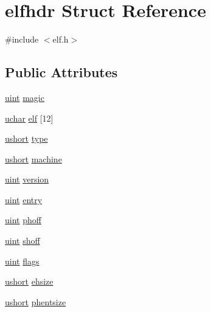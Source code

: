 \hypertarget{structelfhdr}{}\section{elfhdr Struct Reference}
\label{structelfhdr}


{\ttfamily \#include $<$elf.\+h$>$}

\subsection*{Public Attributes}
\begin{DoxyCompactItemize}
\item 
\hyperlink{types_8h_a91ad9478d81a7aaf2593e8d9c3d06a14}{uint} \hyperlink{structelfhdr_a28ee8116d69b533277311c5f3773b6b2}{magic}
\item 
\hyperlink{types_8h_a65f85814a8290f9797005d3b28e7e5fc}{uchar} \hyperlink{structelfhdr_a22ec6f2383f0488ee18a18673398f201}{elf} \mbox{[}12\mbox{]}
\item 
\hyperlink{types_8h_ab95f123a6c9bcfee6a343170ef8c5f69}{ushort} \hyperlink{structelfhdr_a2cd2eaf0c952e30f8196890787ef68fe}{type}
\item 
\hyperlink{types_8h_ab95f123a6c9bcfee6a343170ef8c5f69}{ushort} \hyperlink{structelfhdr_a17113c58d39b044bb1ae78733a8c68fc}{machine}
\item 
\hyperlink{types_8h_a91ad9478d81a7aaf2593e8d9c3d06a14}{uint} \hyperlink{structelfhdr_abb1c8274f47cfdbbcefe44af2d5c723d}{version}
\item 
\hyperlink{types_8h_a91ad9478d81a7aaf2593e8d9c3d06a14}{uint} \hyperlink{structelfhdr_ad40755e1b2c6efc3ec0ad95889f743a5}{entry}
\item 
\hyperlink{types_8h_a91ad9478d81a7aaf2593e8d9c3d06a14}{uint} \hyperlink{structelfhdr_a1d463f67fcf951c06cfaa37850004c51}{phoff}
\item 
\hyperlink{types_8h_a91ad9478d81a7aaf2593e8d9c3d06a14}{uint} \hyperlink{structelfhdr_a465ccdf83d0e26d129d723a493a6e764}{shoff}
\item 
\hyperlink{types_8h_a91ad9478d81a7aaf2593e8d9c3d06a14}{uint} \hyperlink{structelfhdr_a2f1e0957c83938630ef0ed074830df03}{flags}
\item 
\hyperlink{types_8h_ab95f123a6c9bcfee6a343170ef8c5f69}{ushort} \hyperlink{structelfhdr_aeffe5743cc720e5795af5d17b6fd6928}{ehsize}
\item 
\hyperlink{types_8h_ab95f123a6c9bcfee6a343170ef8c5f69}{ushort} \hyperlink{structelfhdr_ac636a4a9c4c61933c6044275ed687bc9}{phentsize}
\item 

\end{DoxyCompactItemize}
